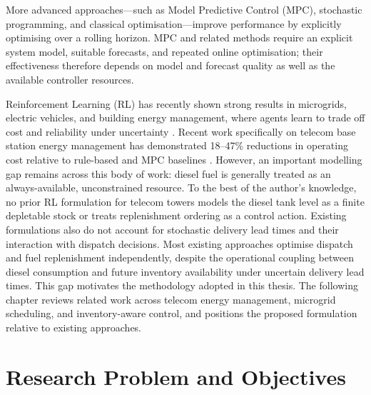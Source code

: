 More advanced approaches---such as Model Predictive Control (MPC), stochastic
programming, and classical optimisation---improve performance by explicitly
optimising over a rolling horizon. MPC and related methods require an
explicit system model, suitable forecasts, and repeated online
optimisation; their effectiveness therefore depends on model and forecast
quality as well as the available controller resources.

Reinforcement Learning (RL) has recently shown strong results in microgrids,
electric vehicles, and building energy management, where agents learn to trade
off cost and reliability under uncertainty
\citep{mao2021_inventory_rl,lin_ev_rl_2024,wang2022_building_rl}. Recent
work specifically on telecom base station energy management has demonstrated
18--47\% reductions in operating cost relative to rule-based and MPC baselines
\citep{ma_pan_2025_telecom_ies,yan_2025_safe_marl_bs,alhajhassan_2024_battery_ageing_rl}.
However, an important modelling gap remains across this body of work: diesel fuel is
generally treated as an always-available, unconstrained resource. To the best
of the author's knowledge, no prior RL formulation for telecom towers models
the diesel tank level as a finite depletable stock or treats replenishment
ordering as a control action. Existing formulations also do not account for
stochastic delivery lead times and their interaction with dispatch decisions.
Most existing approaches optimise dispatch and fuel replenishment
independently, despite the operational coupling between diesel consumption
and future inventory availability under uncertain delivery lead times. This
gap motivates the
methodology adopted in this thesis. The following chapter reviews related
work across telecom energy management, microgrid scheduling, and
inventory-aware control, and positions the proposed formulation relative
to existing approaches.


\section{Research Problem and Objectives}





